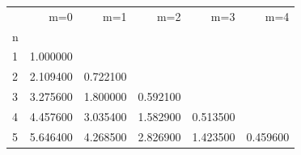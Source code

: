 \begin{tabular}{lrrrrr}
\toprule
 & m=0 & m=1 & m=2 & m=3 & m=4 \\
n &  &  &  &  &  \\
\midrule
1 & 1.000000 &  &  &  &  \\
2 & 2.109400 & 0.722100 &  &  &  \\
3 & 3.275600 & 1.800000 & 0.592100 &  &  \\
4 & 4.457600 & 3.035400 & 1.582900 & 0.513500 &  \\
5 & 5.646400 & 4.268500 & 2.826900 & 1.423500 & 0.459600 \\
\bottomrule
\end{tabular}
